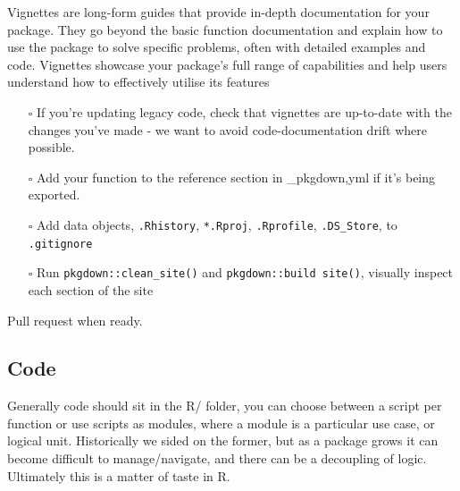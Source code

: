 \documentclass[
  letterpaper,
  DIV=11,
  numbers=noendperiod]{scrreprt}
\begin{document}
\begin{tcolorbox}[enhanced jigsaw, colback=white, opacitybacktitle=0.6, coltitle=black, left=2mm, breakable, bottomtitle=1mm, toptitle=1mm, toprule=.15mm, colframe=quarto-callout-tip-color-frame, titlerule=0mm, title=\textcolor{quarto-callout-tip-color}{\faLightbulb}\hspace{0.5em}{What are vignettes?}, colbacktitle=quarto-callout-tip-color!10!white, rightrule=.15mm, bottomrule=.15mm, arc=.35mm, opacityback=0, leftrule=.75mm]

Vignettes are long-form guides that provide in-depth documentation for
your package. They go beyond the basic function documentation and
explain how to use the package to solve specific problems, often with
detailed examples and code. Vignettes showcase your package's full range
of capabilities and help users understand how to effectively utilise its
features

\end{tcolorbox}

\begin{itemize}
\item[$\square$]
  If you're updating legacy code, check that vignettes are up-to-date
  with the changes you've made - we want to avoid code-documentation
  drift where possible.
\item[$\square$]
  Add your function to the reference section in \_pkgdown,yml if it's
  being exported.
\item[$\square$]
  Add data objects, \texttt{.Rhistory}, \texttt{*.Rproj},
  \texttt{.Rprofile}, \texttt{.DS\_Store}, to \texttt{.gitignore}
\item[$\square$]
  Run \texttt{pkgdown::clean\_site()} and
  \texttt{pkgdown::build\ site()}, visually inspect each section of the
  site
\end{itemize}

Pull request when ready.

\subsection{Code}\label{code-1}

Generally code should sit in the R/ folder, you can choose between a
script per function or use scripts as modules, where a module is a
particular use case, or logical unit. Historically we sided on the
former, but as a package grows it can become difficult to
manage/navigate, and there can be a decoupling of logic. Ultimately this
is a matter of taste in R.
\end{document}
